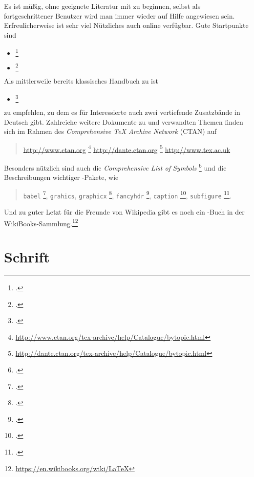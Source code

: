 Es ist müßig, ohne geeignete Literatur mit \latex zu beginnen, selbst
als fortgeschrittener Benutzer wird man immer wieder auf Hilfe angewiesen
sein. Erfreulicherweise ist sehr viel Nützliches auch online verfügbar.
Gute Startpunkte sind \zB
%
\begin{itemize}
\item \emph{}\footcite{Schmidt01}
\item \emph{}\footcite{Oetiker01}
\end{itemize}
%
\noindent
Als mittlerweile bereits klassisches Handbuch zu \latex ist
%
\begin{itemize}
  \item \emph{}\footcite{Kopka98}
\end{itemize}
%
zu empfehlen, zu dem es für Interessierte auch zwei vertiefende
Zusatzbände in Deutsch gibt. Zahlreiche weitere Dokumente zu
\latex und verwandten Themen finden sich \ua im Rahmen des {\em
Comprehensive TeX Archive Network} (CTAN) auf
\begin{quote}
	\url{http://www.ctan.org}%
	\footnote{\url{http://www.ctan.org/tex-archive/help/Catalogue/bytopic.html}}\newline
	\url{http://dante.ctan.org}%
	\footnote{\url{http://dante.ctan.org/tex-archive/help/Catalogue/bytopic.html}}\newline
	\url{http://www.tex.ac.uk}
\end{quote}
%
Besonders nützlich sind auch die
\emph{Comprehensive List of {\rm \latex} Symbols} \footcite{Pakin01}
und die Beschreibungen wichtiger \latex-Pakete, wie
%
\begin{quote}
	\texttt{babel} \footcite{Braams2008},\newline
  \texttt{grahics}, \texttt{graphicx} \footcite{Carlisle99},\newline
  \texttt{fancyhdr} \footcite{Oostrum97},\newline
  \texttt{caption} \footcite{Sommerfeldt07},\newline
  \texttt{subfigure} \footcite{Cochran95}.
\end{quote}


Und zu guter Letzt für die Freunde von Wikipedia gibt es noch ein \latex-Buch in der WikiBooks-Sammlung.\footnote{\url{https://en.wikibooks.org/wiki/LaTeX}}


\section{Schrift}

